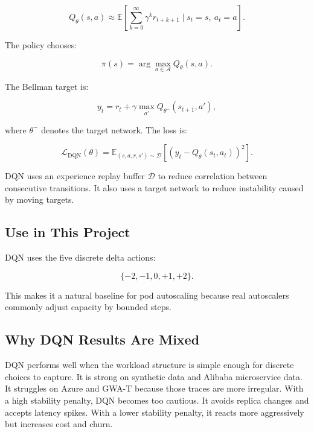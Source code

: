 \documentclass{rapportINPTCLOUD}
\begin{document}
\begin{equation}
Q_{\theta}(s,a)
\approx
\mathbb{E}
\left[
\sum_{k=0}^{\infty}
\gamma^k r_{t+k+1}
\mid
s_t=s,\ a_t=a
\right].
\end{equation}

The policy chooses:

\begin{equation}
\pi(s)
=
\arg\max_{a \in \mathcal{A}}
Q_{\theta}(s,a).
\end{equation}

The Bellman target is:

\begin{equation}
y_t =
r_t
+ \gamma
\max_{a'}
Q_{\theta^-}(s_{t+1},a'),
\end{equation}

where $\theta^-$ denotes the target network. The loss is:

\begin{equation}
\mathcal{L}_{\text{DQN}}(\theta)
=
\mathbb{E}_{(s,a,r,s') \sim \mathcal{D}}
\left[
\left(
y_t - Q_{\theta}(s_t,a_t)
\right)^2
\right].
\end{equation}

DQN uses an experience replay buffer $\mathcal{D}$ to reduce correlation between consecutive transitions. It also uses a target network to reduce instability caused by moving targets.

\subsection{Use in This Project}

DQN uses the five discrete delta actions:

\begin{equation}
\{-2,-1,0,+1,+2\}.
\end{equation}

This makes it a natural baseline for pod autoscaling because real autoscalers commonly adjust capacity by bounded steps.

\subsection{Why DQN Results Are Mixed}

DQN performs well when the workload structure is simple enough for discrete choices to capture. It is strong on synthetic data and Alibaba microservice data. It struggles on Azure and GWA-T because those traces are more irregular. With a high stability penalty, DQN becomes too cautious. It avoids replica changes and accepts latency spikes. With a lower stability penalty, it reacts more aggressively but increases cost and churn.
\end{document}
